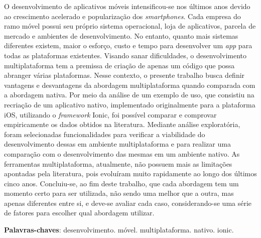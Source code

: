 \begin{resumo}

 O desenvolvimento de aplicativos móveis intensificou-se nos últimos anos devido ao crescimento acelerado e popularização dos 
 \textit{smartphones}. Cada empresa do ramo móvel possui seu próprio sistema operacional, loja de aplicativos, parcela de mercado
  e ambientes de desenvolvimento. No entanto, quanto mais sistemas diferentes existem, maior o esforço, custo e tempo para 
  desenvolver um \textit{app} para todas as plataformas existentes.
 Visando sanar dificuldades, o desenvolvimento multiplataforma tem a premissa de criação de apenas um código que possa abranger 
 várias plataformas. 
 Nesse contexto, o presente trabalho busca definir vantagens e desvantagens da abordagem multiplataforma 
 quando comparada com a abordagem nativa. 
 Por meio da análise de um exemplo de uso, que consistiu na recriação de um aplicativo 
 nativo, implementado originalmente para a plataforma iOS, utilizando o \textit{framework} Ionic, foi possível comparar e 
 comprovar empiricamente os dados obtidos na literatura. 
 Mediante análise exploratória, foram selecionadas funcionalidades para verificar a viabilidade do desenvolvimento dessas
 em ambiente multiplataforma e para realizar uma comparação com o desenvolvimento das mesmas em um ambiente nativo.
 As ferramentas multiplataforma, atualmente, não possuem mais as limitações apontadas pela literatura, pois evoluíram muito 
 rapidamente ao longo dos últimos cinco anos. Concluiu-se, ao fim deste trabalho, que cada abordagem tem um momento certo 
 para ser utilizada, não sendo uma melhor que a outra, mas apenas diferentes entre si, e deve-se avaliar cada caso, 
 considerando-se uma série de fatores para escolher qual abordagem utilizar.

 \vspace{\onelineskip}
    
 \noindent
 \textbf{Palavras-chaves}: desenvolvimento. móvel. multiplataforma. nativo. ionic. 
\end{resumo}
